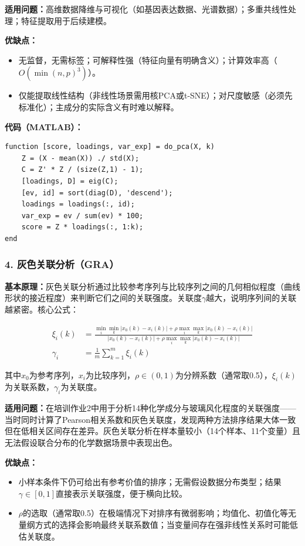 \documentclass[12pt,a4paper]{ctexart}
\begin{document}
\textbf{适用问题：}高维数据降维与可视化（如基因表达数据、光谱数据）；多重共线性处理；特征提取用于后续建模。

\textbf{优缺点：}
\begin{itemize}[leftmargin=*]
    \item[+] 无监督，无需标签；可解释性强（特征向量有明确含义）；计算效率高（$O(\min(n,p)^3)$）。
    \item[$-$] 仅能提取线性结构（非线性场景需用核PCA或t-SNE）；对尺度敏感（必须先标准化）；主成分的实际含义有时难以解释。
\end{itemize}

\textbf{代码（MATLAB）：}
\begin{lstlisting}
function [score, loadings, var_exp] = do_pca(X, k)
    Z = (X - mean(X)) ./ std(X);
    C = Z' * Z / (size(Z,1) - 1);
    [loadings, D] = eig(C);
    [ev, id] = sort(diag(D), 'descend');
    loadings = loadings(:, id);
    var_exp = ev / sum(ev) * 100;
    score = Z * loadings(:, 1:k);
end
\end{lstlisting}

\subsubsection{4. 灰色关联分析（GRA）}

\textbf{基本原理：}灰色关联分析通过比较参考序列与比较序列之间的几何相似程度（曲线形状的接近程度）来判断它们之间的关联强度。关联度$\gamma$越大，说明序列间的关联越紧密。核心公式：

\begin{align}
\xi_i(k) &= \frac{\min_i \min_k |x_0(k)-x_i(k)| + \rho \max_i \max_k |x_0(k)-x_i(k)|}
                 {|x_0(k)-x_i(k)| + \rho \max_i \max_k |x_0(k)-x_i(k)|} \\
\gamma_i  &= \frac{1}{m} \sum_{k=1}^{m} \xi_i(k)
\end{align}

其中$x_0$为参考序列，$x_i$为比较序列，$\rho \in (0,1)$为分辨系数（通常取0.5），$\xi_i(k)$为关联系数，$\gamma_i$为关联度。

\textbf{适用问题：}在培训作业2中用于分析14种化学成分与玻璃风化程度的关联强度——当时同时计算了Pearson相关系数和灰色关联度，发现两种方法排序结果大体一致但在低相关区间存在差异。灰色关联分析在样本量较小（14个样本、11个变量）且无法假设联合分布的化学数据场景中表现出色。

\textbf{优缺点：}
\begin{itemize}[leftmargin=*]
    \item[+] 小样本条件下仍可给出有参考价值的排序；无需假设数据分布类型；结果$\gamma \in [0,1]$直接表示关联强度，便于横向比较。
    \item[$-$] $\rho$的选取（通常取0.5）在极端情况下对排序有微弱影响；均值化、初值化等无量纲方式的选择会影响最终关联系数值；当变量间存在强非线性关系时可能低估关联度。
\end{itemize}
\end{document}
